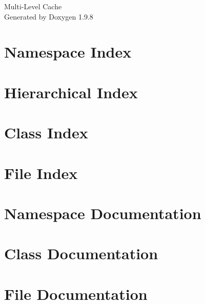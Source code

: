\documentclass[twoside]{book}
\newcommand{\+}{\discretionary{\mbox{\scriptsize$\hookleftarrow$}}{}{}}
\newcommand{\clearemptydoublepage}{%
    \newpage{\pagestyle{empty}\cleardoublepage}%
  }
\begin{document}
  \raggedbottom
    \hypersetup{pageanchor=false,
                bookmarksnumbered=true,
                pdfencoding=unicode
               }
  \begin{titlepage}
  \vspace*{7cm}
  \begin{center}%
  {\Large Multi-\/\+Level Cache}\\
  \vspace*{1cm}
  {\large Generated by Doxygen 1.9.8}\\
  \end{center}
  \end{titlepage}
  \clearemptydoublepage
  \tableofcontents
  \clearemptydoublepage
  \hypersetup{pageanchor=true}

\chapter{Namespace Index}

\chapter{Hierarchical Index}

\chapter{Class Index}

\chapter{File Index}

\chapter{Namespace Documentation}

\chapter{Class Documentation}











\chapter{File Documentation}












  \backmatter
  \newpage
  \clearemptydoublepage
  \printindex
\end{document}
